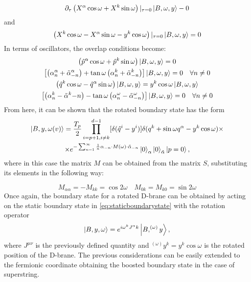 \begin{equation}
\partial_\tau\left(X^\alpha\cos\omega + X^k\sin\omega\right)\vert_{\tau=0}\ket{B,\omega,y} - 0
\end{equation}
and
\begin{equation}
\left(X^k\cos\omega - X^\alpha\sin\omega - y^k\cos\omega\right)\vert_{\tau=0}\ket{B,\omega,y} = 0
\end{equation}
In terms of oscillators, the overlap conditions become:
\begin{gather}
\left(\hat{p}^\alpha\cos\omega + \hat{p}^k\sin\omega\right)\ket{B,\omega,y} =  0 \\
\left[\left(\alpha_n^\alpha + \tilde{\alpha}^\alpha_{-n}\right)+ \tan\omega\left(\alpha_n^k + \tilde{\alpha}^k_{-n}\right)\right]\ket{B,\omega,y} =  0 \quad\forall n\neq 0\\
\left(\hat{q}^k\cos\omega - \hat{q}^\alpha\sin\omega\right)\ket{B,\omega,y} = y^k\cos\omega\ket{B,\omega,y}\\
\left[\left(\alpha_n^k - \tilde{\alpha}^k{-n}\right)- \tan\omega\left(\alpha_n^\omega - \tilde{\alpha}^\omega_{-n}\right)\right]\ket{B,\omega,y} =  0\quad\forall n\neq 0
\end{gather}
From here, it can be shown that the rotated boundary state has the form
\begin{multline}
\ket{B,y,\omega(v)} = \frac{T_p}{2} \prod_{i=p+1,i\neq k}^{d-1}[\delta(\hat{q}^i - y^i)]\delta(q^k + \sin\omega q^\alpha - y^k\cos\omega)\times\\
\times e^{-\sum_{n=1}^\infty \frac{1}{n}\alpha_{-n}\cdot M(\omega)\cdot\tilde{\alpha}_{-n}}\ket{0}_\alpha \ket{0}_{\tilde{\alpha}}\ket{p=0},
\end{multline}
where in this case the matrix $M$ can be obtained from the matrix $S$, substituting its elements in the following way:

\begin{equation}
M_{\alpha\alpha} = - M_{kk} = \cos 2\omega\quad M_{0k} = M_{k0} = \sin 2\omega
\end{equation}
Once again, the boundary state for a rotated D-brane can be obtained by acting on the static boundary state in \eqref{eq:staticboundarystate} with the rotation operator
\begin{equation}
\ket{B,y,\omega} = e^{i\omega^kJ^\alpha k}\ket{B,^{(\omega)}y},
\end{equation}
where $J^{\mu\nu}$ is the previously defined quantity and $^{(\omega)}y^k = y^k\cos\omega$ is the rotated position of the D-brane. The previous considerations can be easily extended to the fermionic coordinate obtaining the boosted boundary state in the case of superstring.

